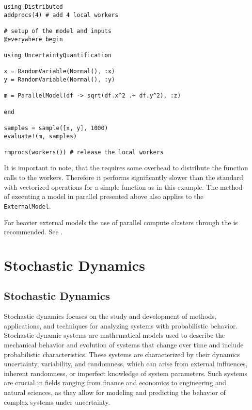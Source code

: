\begin{verbatim}
using Distributed
addprocs(4) # add 4 local workers

# setup of the model and inputs
@everywhere begin

using UncertaintyQuantification

x = RandomVariable(Normal(), :x)
y = RandomVariable(Normal(), :y)

m = ParallelModel(df -> sqrt(df.x^2 .+ df.y^2), :z)

end

samples = sample([x, y], 1000)
evaluate!(m, samples)

rmprocs(workers()) # release the local workers
\end{verbatim}



It is important to note, that the  requires some overhead to distribute the function calls to the workers. Therefore it performs significantly slower than the standard  with vectorized operations for a simple function as in this example. The method of executing a model in parallel presented above also applies to the \texttt{ExternalModel}.



\begin{tcolorbox}[toptitle=-1mm,bottomtitle=1mm,colback=admonition-note!50!white,colframe=admonition-note,title=\textbf{Note}]
For heavier external models the use of parallel compute clusters through the  is recommended. See .

\end{tcolorbox}


\chapter{Stochastic Dynamics}


\section{Stochastic Dynamics}



\label{8402073698242581879}{}


Stochastic dynamics focuses on the study and development of methods, applications, and techniques for analyzing systems with probabilistic behavior. Stochastic dynamic systems are mathematical models used to describe the mechanical behavior and evolution of systems that change over time and include probabilistic characteristics. These systems are characterized by their dynamics{\textquotesingle} uncertainty, variability, and randomness, which can arise from external influences, inherent randomness, or imperfect knowledge of system parameters. Such systems are crucial in fields ranging from finance and economics to engineering and natural sciences, as they allow for modeling and predicting the behavior of complex systems under uncertainty.



